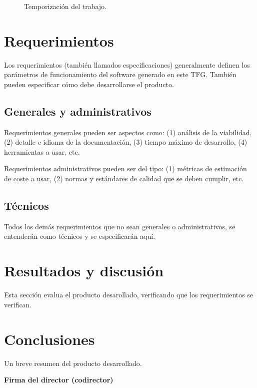 \documentclass[titlepage, 12pt, a4paper, oneside]{article}
\begin{document}
\begin{figure}
  \begin{center}
  \end{center}
  \caption{Temporización del trabajo.\label{fig:temporizacion}}
\end{figure}

\section{Requerimientos}
Los requerimientos (también llamados especificaciones) generalmente
definen los parámetros de funcionamiento del software generado en este
TFG. También pueden especificar cómo debe desarrollarse el producto.

\subsection{Generales y administrativos}
Requerimientos generales pueden ser aspectos como: (1) análisis de la viabilidad, (2) detalle e idioma de la documentación, (3) tiempo máximo de desarrollo, (4) herramientas a usar, etc.

Requerimientos administrativos pueden ser del tipo: (1) métricas de estimación de coste a usar, (2) normas y estándares de calidad que se deben cumplir, etc.

\subsection{Técnicos}
Todos los demás requerimientos que no sean generales o administrativos, se entenderán como técnicos y se especificarán aquí.

\section{Resultados y discusión}
Esta sección evalua el producto desarollado, verificando que los requerimientos se verifican.

\section{Conclusiones}
Un breve resumen del producto desarrollado.




\begin{center}
  \textbf{Firma del director (codirector)}
\end{center}
\end{document}
